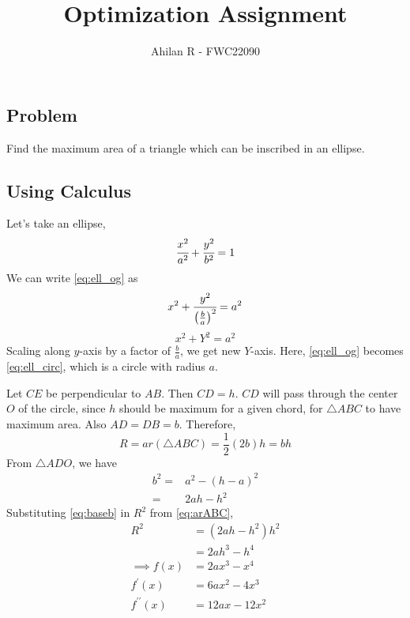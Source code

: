 \documentclass[journal,12pt,twocolumn]{IEEEtran}
\title{Optimization Assignment}
\author{Ahilan R - FWC22090}
\begin{document}
\maketitle

\subsection*{\textbf{Problem}}
Find the maximum area of a triangle which can be inscribed in an ellipse.
\subsection*{\textbf{Using Calculus}}
Let's take an ellipse,
\begin{equation}
		\cfrac{x^2}{a^2} + \cfrac{y^2}{b^2} = 1 \label{eq:ell_og}
\end{equation}
We can write \eqref{eq:ell_og} as
\[	x^2 + \cfrac{y^2}{\left( \frac{b}{a} \right) ^2} = a^2 \]
\begin{equation}
x^2 + Y^2 = a^2 \label{eq:ell_circ}
\end{equation}
Scaling along $y$-axis by a factor of $\frac{b}{a}$, we get new $Y$-axis. Here, \eqref{eq:ell_og} becomes \eqref{eq:ell_circ}, which is a circle with radius $a$. 

\begin{figure}[h]
\centering
\def\figwidth{\linewidth}
\def\figheight{0.35\textheight} %

\label{fig:roughSketch}
\end{figure}

Let $CE$ be perpendicular to $AB$. Then $CD=h$. $CD$ will pass through the center $O$ of the circle, since $h$ should be maximum for a given chord, for $\triangle ABC$ to have maximum area. Also $AD=DB=b$. Therefore, 
\begin{equation}
R = ar(\triangle ABC)= \frac{1}{2}(2b)h= bh \label{eq:arABC}
\end{equation}
From $\triangle ADO$, we have
\begin{align}
		b^2 =& a^2- (h-a)^2 \nonumber \\ %
		=& 2ah-h^2 \label{eq:baseb}
\end{align}
Substituting \eqref{eq:baseb} in $R^2$ from \eqref{eq:arABC},
\begin{align}
		R^2 &= (2ah-h^2)h^2 \nonumber \\
		&= 2ah^3-h^4 \\
		\implies f(x) &= 2ax^3-x^4 \label{eq:fofx} \\
		f^{\prime}(x) &= 6ax^2 -4x^3 \label{eq:fprime} \\
		f^{\prime\prime}(x) &= 12ax -12x^2 \label{eq:fdprime}
\end{align}
\end{document}
